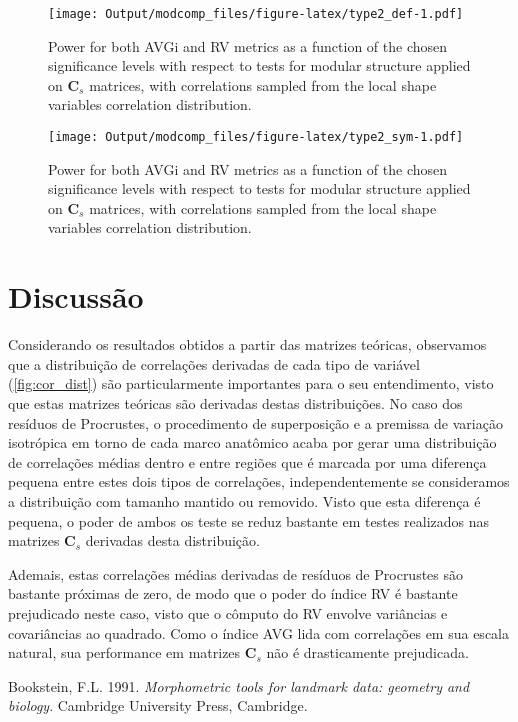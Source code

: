 \documentclass[11pt,]{article}
\begin{document}
\begin{figure}[htbp]
\centering
\texttt{[image: Output/modcomp\_files/figure-latex/type2\_def-1.pdf]}
\caption{Power for both AVGi and RV metrics as a function of the chosen
significance levels with respect to tests for modular structure applied
on $\mathbf{C}_s$ matrices, with correlations sampled from the local
shape variables correlation distribution. \label{fig:type2_def}}
\end{figure}

\begin{figure}[htbp]
\centering
\texttt{[image: Output/modcomp\_files/figure-latex/type2\_sym-1.pdf]}
\caption{Power for both AVGi and RV metrics as a function of the chosen
significance levels with respect to tests for modular structure applied
on $\mathbf{C}_s$ matrices, with correlations sampled from the local
shape variables correlation distribution. \label{fig:type2_sym}}
\end{figure}

\section{Discussão}\label{discussao}

Considerando os resultados obtidos a partir das matrizes teóricas,
observamos que a distribuição de correlações derivadas de cada tipo de
variável (\autoref{fig:cor_dist}) são particularmente importantes para o
seu entendimento, visto que estas matrizes teóricas são derivadas destas
distribuições. No caso dos resíduos de Procrustes, o procedimento de
superposição e a premissa de variação isotrópica em torno de cada marco
anatômico acaba por gerar uma distribuição de correlações médias dentro
e entre regiões que é marcada por uma diferença pequena entre estes dois
tipos de correlações, independentemente se consideramos a distribuição
com tamanho mantido ou removido. Visto que esta diferença é pequena, o
poder de ambos os teste se reduz bastante em testes realizados nas
matrizes $\mathbf{C}_s$ derivadas desta distribuição.

Ademais, estas correlações médias derivadas de resíduos de Procrustes
são bastante próximas de zero, de modo que o poder do índice RV é
bastante prejudicado neste caso, visto que o cômputo do RV envolve
variâncias e covariâncias ao quadrado. Como o índice AVG lida com
correlações em sua escala natural, sua performance em matrizes
$\mathbf{C}_s$ não é drasticamente prejudicada.

Bookstein, F.L. 1991. \emph{Morphometric tools for landmark data:
geometry and biology}. Cambridge University Press, Cambridge.
\end{document}
